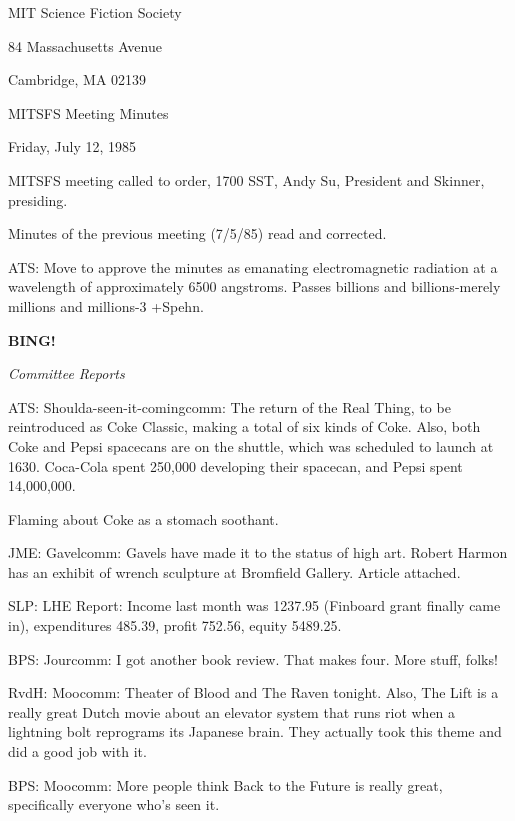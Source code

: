\documentclass[12pt]{article}
\newcommand{\bing}{{\bf BING!} }
\newcommand{\goto}[1]{\bing \vskip 12pt \centerline{{\em{#1}}}}
\begin{document}
\begin{center}

MIT Science Fiction Society 

84 Massachusetts Avenue

Cambridge, MA 02139

\vspace{12pt}

MITSFS Meeting Minutes 

Friday, July 12, 1985

\end{center}
 
\vspace{18pt}

\setlength{\parskip}{6pt}

\noindent
MITSFS meeting called to order, 1700 SST,
Andy Su, President and Skinner, presiding.

Minutes of the previous meeting (7/5/85) read and corrected.

ATS: Move to approve the minutes as emanating electromagnetic radiation at a wavelength of approximately 6500 angstroms. Passes billions and billions-merely millions and millions-3 +Spehn.

\goto{Committee Reports}

ATS: Shoulda-seen-it-comingcomm: The return of the Real Thing, to be reintroduced as Coke Classic, making a total of six kinds of Coke. Also, both Coke and Pepsi spacecans are on the shuttle, which was scheduled to launch at 1630. Coca-Cola spent 250,000 developing their spacecan, and Pepsi spent 14,000,000.

Flaming about Coke as a stomach soothant.

JME: Gavelcomm: Gavels have made it to the status of high art. Robert Harmon has an exhibit of wrench sculpture at Bromfield Gallery. Article attached.

SLP: LHE Report: Income last month was 1237.95 (Finboard grant finally came in), expenditures 485.39, profit 752.56, equity 5489.25.

BPS: Jourcomm: I got another book review. That makes four. More stuff, folks!

RvdH: Moocomm: Theater of Blood and The Raven tonight. Also, The Lift is a really great Dutch movie about an elevator system that runs riot when a lightning bolt reprograms its Japanese brain. They actually took this theme and did a good job with it.

BPS: Moocomm: More people think Back to the Future is really great, specifically everyone who's seen it.
\end{document}
